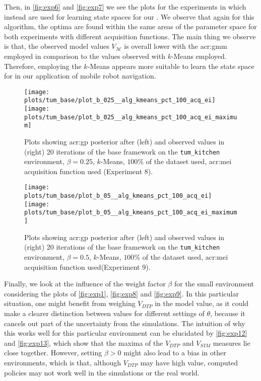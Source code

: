Then, in \autoref{fig:exp6} and \autoref{fig:exp7} we see the plots for the experiments in which instead  are used for learning state spaces for our .
We observe that again for this algorithm, the optima are found within the same areas of the parameter space for both experiments with different acquisition functions.
The main thing we observe is that, the observed model values $V_\mathcal{M}$ is overall lower with the \acrshort{acr:gmm} employed in comparison to the values observed with $k$-Means employed.
Therefore, employing the $k$-Means appears more suitable to learn the state space for  in our application of mobile robot navigation.

\begin{figure}[t!]
	\centering
	\texttt{[image: plots/tum\_base/plot\_b\_025\_\_alg\_kmeans\_pct\_100\_acq\_ei]}
	\texttt{[image: plots/tum\_base/plot\_b\_025\_\_alg\_kmeans\_pct\_100\_acq\_ei\_maximum]}
	\caption{Plots showing \acrshort{acr:gp} posterior after (left) and observed values in (right) 20 iterations of the base framework on the \texttt{tum\_kitchen} environment, $\beta = 0.25$, $k$-Means, $100\%$ of the dataset used, \acrshort{acr:mei} acquisition function used (Experiment 8).}
	\label{fig:exp8}
\end{figure}

\begin{figure}[t]
	\centering
	\texttt{[image: plots/tum\_base/plot\_b\_05\_\_alg\_kmeans\_pct\_100\_acq\_ei]}
	\texttt{[image: plots/tum\_base/plot\_b\_05\_\_alg\_kmeans\_pct\_100\_acq\_ei\_maximum]}
	\caption{Plots showing \acrshort{acr:gp} posterior after (left) and observed values in (right) 20 iterations of the base framework on the \texttt{tum\_kitchen} environment, $\beta = 0.5$, $k$-Means, $100\%$ of the dataset used, \acrshort{acr:mei} acquisition function used(Experiment 9).}
	\label{fig:exp9}
\end{figure}
	
Finally, we look at the influence of the weight factor $\beta$ for the small environment considering the plots of \autoref{fig:exp1}, \autoref{fig:exp8} and \autoref{fig:exp9}.
In this particular situation, one might benefit from weighing $V_\mathit{DTP}$ in the model value, as it could make a clearer distinction between values for different settings of $\theta$, because it cancels out part of the uncertainty from the simulations.
The intuition of why this works well for this particular environment can be elucidated by \autoref{fig:exp12} and \autoref{fig:exp13}, which show that the maxima of the $V_\mathit{DTP}$ and $V_\mathit{SIM}$ measures lie close together.
However, setting $\beta > 0$ might also lead to a bias in other environments, which is that, although $V_\mathit{DTP}$ may have high value, computed policies may not work well in the simulations or the real world.

